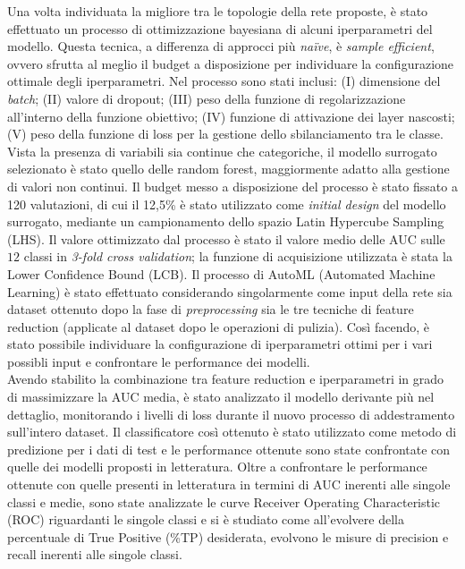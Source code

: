 Una volta individuata la migliore tra le topologie della rete proposte, è stato effettuato un processo di ottimizzazione bayesiana di alcuni iperparametri del modello. 
Questa tecnica, a differenza di approcci più \textit{na\"ive}, è \textit{sample efficient}, ovvero sfrutta al meglio il budget a disposizione per individuare la configurazione ottimale degli iperparametri. Nel processo sono stati inclusi: (I) dimensione del \textit{batch}; (II) valore di dropout; (III) peso della funzione di regolarizzazione all'interno della funzione obiettivo; (IV) funzione di attivazione dei layer nascosti; (V) peso della funzione di loss per la gestione dello sbilanciamento tra le classe.
Vista la presenza di variabili sia continue che categoriche, il modello surrogato selezionato è stato quello delle random forest, maggiormente adatto alla gestione di valori non continui. 
Il budget messo a disposizione del processo è stato fissato a 120 valutazioni, di cui il 12,5\% è stato utilizzato come \textit{initial design} del modello surrogato, mediante un campionamento dello spazio Latin Hypercube Sampling (LHS). Il valore ottimizzato dal processo è stato il valore medio delle AUC sulle $12$ classi in \textit{3-fold cross validation}; la funzione di acquisizione utilizzata è stata la Lower Confidence Bound (LCB).
Il processo di AutoML (Automated Machine Learning) è stato effettuato considerando singolarmente come input della rete sia dataset ottenuto dopo la fase di \textit{preprocessing} sia le tre tecniche di feature reduction (applicate al dataset dopo le operazioni di pulizia).
Così facendo, è stato possibile individuare la configurazione di iperparametri ottimi per i vari possibli input e confrontare le performance dei modelli.\\ 
Avendo stabilito la combinazione tra feature reduction e iperparametri in grado di massimizzare la AUC media, è stato analizzato il modello derivante più nel dettaglio, monitorando i livelli di loss durante il nuovo processo di addestramento sull'intero dataset.
Il classificatore così ottenuto è stato utilizzato come metodo di predizione per i dati di test e le performance ottenute sono state confrontate con quelle dei modelli proposti in letteratura.
Oltre a confrontare le performance ottenute con quelle presenti in letteratura in termini di AUC inerenti alle singole classi e medie, sono state analizzate le curve Receiver Operating Characteristic (ROC) riguardanti le singole classi e si è studiato come all'evolvere della percentuale di True Positive (\%TP) desiderata, evolvono le misure di precision e recall inerenti alle singole classi.
